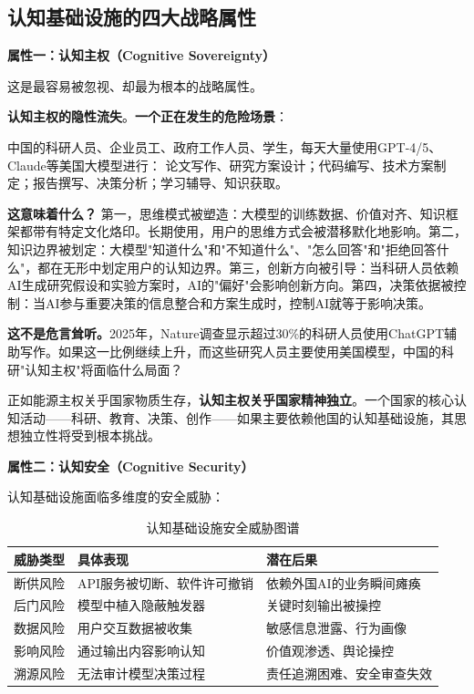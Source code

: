 \subsection{认知基础设施的四大战略属性}

\textbf{属性一：认知主权（Cognitive Sovereignty）}

这是最容易被忽视、却最为根本的战略属性。

\textbf{认知主权的隐性流失}。\textbf{一个正在发生的危险场景}：

中国的科研人员、企业员工、政府工作人员、学生，每天大量使用GPT-4/5、Claude等美国大模型进行：
论文写作、研究方案设计；代码编写、技术方案制定；报告撰写、决策分析；学习辅导、知识获取。

\textbf{这意味着什么？}
第一，思维模式被塑造：大模型的训练数据、价值对齐、知识框架都带有特定文化烙印。长期使用，用户的思维方式会被潜移默化地影响。第二，知识边界被划定：大模型"知道什么"和"不知道什么"、"怎么回答"和"拒绝回答什么"，都在无形中划定用户的认知边界。第三，创新方向被引导：当科研人员依赖AI生成研究假设和实验方案时，AI的"偏好"会影响创新方向。第四，决策依据被控制：当AI参与重要决策的信息整合和方案生成时，控制AI就等于影响决策。

\textbf{这不是危言耸听。}2025年，Nature调查显示超过30\%的科研人员使用ChatGPT辅助写作。如果这一比例继续上升，而这些研究人员主要使用美国模型，中国的科研"认知主权"将面临什么局面？

正如能源主权关乎国家物质生存，\textbf{认知主权关乎国家精神独立}。一个国家的核心认知活动——科研、教育、决策、创作——如果主要依赖他国的认知基础设施，其思想独立性将受到根本挑战。

\textbf{属性二：认知安全（Cognitive Security）}

认知基础设施面临多维度的安全威胁：

\begin{table}[H]
\centering
\caption{认知基础设施安全威胁图谱}
\small
\begin{tabular}{p{2.5cm}p{4cm}p{5cm}}
\toprule
\textbf{威胁类型} & \textbf{具体表现} & \textbf{潜在后果} \\
\midrule
断供风险 & API服务被切断、软件许可撤销 & 依赖外国AI的业务瞬间瘫痪 \\
后门风险 & 模型中植入隐蔽触发器 & 关键时刻输出被操控 \\
数据风险 & 用户交互数据被收集 & 敏感信息泄露、行为画像 \\
影响风险 & 通过输出内容影响认知 & 价值观渗透、舆论操控 \\
溯源风险 & 无法审计模型决策过程 & 责任追溯困难、安全审查失效 \\
\bottomrule
\end{tabular}
\end{table}


